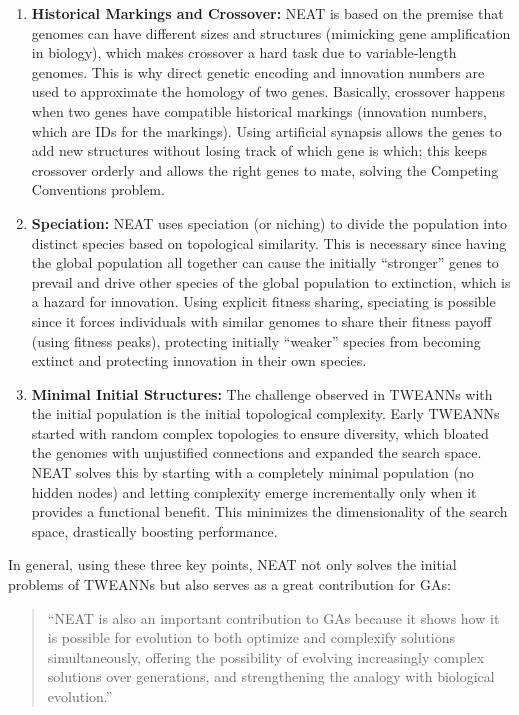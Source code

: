 \begin{enumerate}
    \item \textbf{Historical Markings and Crossover:} NEAT is based on the premise that genomes can have different sizes and structures (mimicking gene amplification in biology), which makes crossover a hard task due to variable-length genomes. This is why direct genetic encoding and innovation numbers are used to approximate the homology of two genes. Basically, crossover happens when two genes have compatible historical markings (innovation numbers, which are IDs for the markings). Using artificial synapsis allows the genes to add new structures without losing track of which gene is which; this keeps crossover orderly and allows the right genes to mate, solving the Competing Conventions problem.
    
    \item \textbf{Speciation:} NEAT uses speciation (or niching) to divide the population into distinct species based on topological similarity. This is necessary since having the global population all together can cause the initially ``stronger'' genes to prevail and drive other species of the global population to extinction, which is a hazard for innovation. Using explicit fitness sharing, speciating is possible since it forces individuals with similar genomes to share their fitness payoff (using fitness peaks), protecting initially ``weaker'' species from becoming extinct and protecting innovation in their own species.
    
    \item \textbf{Minimal Initial Structures:} The challenge observed in TWEANNs with the initial population is the initial topological complexity. Early TWEANNs started with random complex topologies to ensure diversity, which bloated the genomes with unjustified connections and expanded the search space. NEAT solves this by starting with a completely minimal population (no hidden nodes) and letting complexity emerge incrementally only when it provides a functional benefit. This minimizes the dimensionality of the search space, drastically boosting performance.
\end{enumerate}

In general, using these three key points, NEAT not only solves the initial problems of TWEANNs but also serves as a great contribution for GAs:

\begin{quote}
``NEAT is also an important contribution to GAs because it shows how it is possible for evolution to both optimize and complexify solutions simultaneously, offering the possibility of evolving increasingly complex solutions over generations, and strengthening the analogy with biological evolution.'' \cite{stanley2002}
\end{quote}

